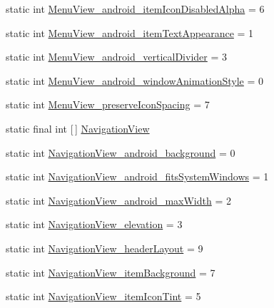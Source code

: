 \begin{DoxyCompactItemize}
static int \hyperlink{classandroid_1_1support_1_1design_1_1R_1_1styleable_ad79c85741d32debefed2622b6ef2577f}{Menu\+View\+\_\+android\+\_\+item\+Icon\+Disabled\+Alpha} = 6
\item 
static int \hyperlink{classandroid_1_1support_1_1design_1_1R_1_1styleable_a116d9432d77aa3d62ec171b23d0bee4c}{Menu\+View\+\_\+android\+\_\+item\+Text\+Appearance} = 1
\item 
static int \hyperlink{classandroid_1_1support_1_1design_1_1R_1_1styleable_afadfabc8bd18f617b9220fe44a79d46f}{Menu\+View\+\_\+android\+\_\+vertical\+Divider} = 3
\item 
static int \hyperlink{classandroid_1_1support_1_1design_1_1R_1_1styleable_a4e2664155896bc2a2363684e68573525}{Menu\+View\+\_\+android\+\_\+window\+Animation\+Style} = 0
\item 
static int \hyperlink{classandroid_1_1support_1_1design_1_1R_1_1styleable_a95328f75cc0262ab91e2f350455b98bc}{Menu\+View\+\_\+preserve\+Icon\+Spacing} = 7
\item 
static final int \mbox{[}$\,$\mbox{]} \hyperlink{classandroid_1_1support_1_1design_1_1R_1_1styleable_a277c199f371e8804c26e2cd6dbf88999}{Navigation\+View}
\item 
static int \hyperlink{classandroid_1_1support_1_1design_1_1R_1_1styleable_a34e995ad1dfc358170b4d33b64c44416}{Navigation\+View\+\_\+android\+\_\+background} = 0
\item 
static int \hyperlink{classandroid_1_1support_1_1design_1_1R_1_1styleable_a7d4c3e8d72fd2345f359507c8482446e}{Navigation\+View\+\_\+android\+\_\+fits\+System\+Windows} = 1
\item 
static int \hyperlink{classandroid_1_1support_1_1design_1_1R_1_1styleable_a9bc98cd7d61a1ee939f9db53d2db45e4}{Navigation\+View\+\_\+android\+\_\+max\+Width} = 2
\item 
static int \hyperlink{classandroid_1_1support_1_1design_1_1R_1_1styleable_a6b7bb0f2e0a1c1223302afa887d09d7a}{Navigation\+View\+\_\+elevation} = 3
\item 
static int \hyperlink{classandroid_1_1support_1_1design_1_1R_1_1styleable_a08ec1aafadcca65cbe363af269714f38}{Navigation\+View\+\_\+header\+Layout} = 9
\item 
static int \hyperlink{classandroid_1_1support_1_1design_1_1R_1_1styleable_a5dcfbed64b1824f484b663ac8f7e2ef1}{Navigation\+View\+\_\+item\+Background} = 7
\item 
static int \hyperlink{classandroid_1_1support_1_1design_1_1R_1_1styleable_ab2caef989041576424f200206e9224b3}{Navigation\+View\+\_\+item\+Icon\+Tint} = 5

\end{DoxyCompactItemize}

